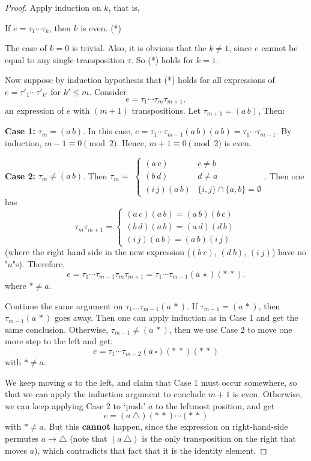 \begin{proof}
Apply induction on $k$, that is,
\begin{center}
If $e = \tau_1 \cdots \tau_k$, then $k$ is even. \quad \quad (*)
\end{center}
The case of $k=0$ is trivial. Also, it is obvious that the $k \neq 1$, since $e$ cannot be equal to any single transposition $\tau$. So (*) holds for $k=1$. 

Now suppose by induction hypothesis that (*) holds for all expressions of $e = \tau'_1 \cdots \tau'_{k'}$ for $k' \le m$. Consider 
$$e = \tau_1 \cdots \tau_m \tau_{m+1},$$ 
an expression of $e$ with $(m+1)$ transpositions. Let $\tau_{m+1} = (a\,b)$, Then:

\textbf{Case 1:} $\tau_m = (a\,b)$. In this case, $e = \tau_1 \cdots \tau_{m-1}(a\,b)(a\,b) = \tau_1 \cdots \tau_{m-1}$. By induction, $m-1 \equiv 0 \pmod 2$. Hence, $m+1 \equiv 0 \pmod 2$ is even.

\textbf{Case 2:} $\tau_m \neq (a\,b)$. Then $\tau_m = $
$\begin{cases} 
(a\,c) & c \neq b\\
(b\,d) & d \neq a \\
(i\,j)(a\,b) & \{i,j\} \cap \{a,b\} = \emptyset
\end{cases}$. Then one has
$$\tau_m \tau_{m+1} = 
\begin{cases} 
(a\,c)(a\,b) = (a\,b)(b\,c) \\
(b\,d)(a\,b) = (a\,d)(d\,b) \\
(i\,j)(a\,b) = (a\,b)(i\,j) 
\end{cases}$$ 
(where the right hand side in the new expression ($(b\ c)$, $(d\ b)$, $(i\ j)$) have no "$a$"s). Therefore,
$$e = \tau_1 \cdots \tau_{m-1} \tau_m \tau_{m+1} = \tau_1 \cdots \tau_{m-1} (a\,\star)(\ast\,\ast).$$
where $\ast \neq a$. 

Continue the same argument on  $\tau_1 \dots \tau_{m-1}(a\,*)$. If $\tau_{m-1} = (a\,*)$, then $\tau_{m-1}(a\,*)$ goes away. Then one can apply induction as in Case 1 and get the same conclusion. Otherwise, $\tau_{m-1} \neq (a\,*)$, then we use Case 2 to move one more step to the left and get: 
$$e = \tau_1 \cdots \tau_{m-2} (a\, \square)(\ast \,\ast)(\ast\,\ast)$$ 
with $\ast \neq a$. 

We keep moving $a$ to the left, and claim that Case 1 must occur somewhere, so that we can apply the induction argument to conclude $m+1$ is even. Otherwise, we can keep applying Case 2 to `push' $a$ to the leftmost position, and get
$$e = (a\,\triangle) (*\,*) \cdots (*\,*)$$ 
with $\ast \neq a$. But this \textbf{cannot} happen, since the expression on right-hand-side permutes $a \to \triangle$ (note that $(a\ \triangle)$ is the only transposition on the right that moves $a$), which contradicts that fact that it is the identity element. 
\end{proof}

